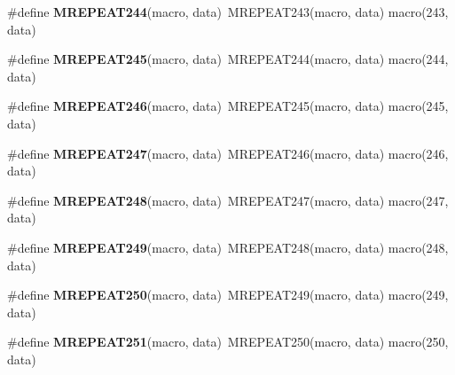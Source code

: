 \begin{DoxyCompactItemize}
\item 
\hypertarget{group__group__sam0__utils__mrepeat_ga96b96568f137828bd94f1df72f9ea533}{}\#define {\bfseries M\+R\+E\+P\+E\+A\+T244}(macro,  data)~M\+R\+E\+P\+E\+A\+T243(macro, data)   macro(243, data)\label{group__group__sam0__utils__mrepeat_ga96b96568f137828bd94f1df72f9ea533}

\item 
\hypertarget{group__group__sam0__utils__mrepeat_gaef88abd24a21c1424bcef16151f33acc}{}\#define {\bfseries M\+R\+E\+P\+E\+A\+T245}(macro,  data)~M\+R\+E\+P\+E\+A\+T244(macro, data)   macro(244, data)\label{group__group__sam0__utils__mrepeat_gaef88abd24a21c1424bcef16151f33acc}

\item 
\hypertarget{group__group__sam0__utils__mrepeat_ga648b2d33e6ae37d7f576055603bcb620}{}\#define {\bfseries M\+R\+E\+P\+E\+A\+T246}(macro,  data)~M\+R\+E\+P\+E\+A\+T245(macro, data)   macro(245, data)\label{group__group__sam0__utils__mrepeat_ga648b2d33e6ae37d7f576055603bcb620}

\item 
\hypertarget{group__group__sam0__utils__mrepeat_ga93c99f19dd27b6ad1c3921e4f473f50d}{}\#define {\bfseries M\+R\+E\+P\+E\+A\+T247}(macro,  data)~M\+R\+E\+P\+E\+A\+T246(macro, data)   macro(246, data)\label{group__group__sam0__utils__mrepeat_ga93c99f19dd27b6ad1c3921e4f473f50d}

\item 
\hypertarget{group__group__sam0__utils__mrepeat_ga0bee84ef9cc1bc4f81563c8fc476fed4}{}\#define {\bfseries M\+R\+E\+P\+E\+A\+T248}(macro,  data)~M\+R\+E\+P\+E\+A\+T247(macro, data)   macro(247, data)\label{group__group__sam0__utils__mrepeat_ga0bee84ef9cc1bc4f81563c8fc476fed4}

\item 
\hypertarget{group__group__sam0__utils__mrepeat_ga09e41b2792e87e2db97093c344127c3d}{}\#define {\bfseries M\+R\+E\+P\+E\+A\+T249}(macro,  data)~M\+R\+E\+P\+E\+A\+T248(macro, data)   macro(248, data)\label{group__group__sam0__utils__mrepeat_ga09e41b2792e87e2db97093c344127c3d}

\item 
\hypertarget{group__group__sam0__utils__mrepeat_ga35656197f887f34430287ec13dc48193}{}\#define {\bfseries M\+R\+E\+P\+E\+A\+T250}(macro,  data)~M\+R\+E\+P\+E\+A\+T249(macro, data)   macro(249, data)\label{group__group__sam0__utils__mrepeat_ga35656197f887f34430287ec13dc48193}

\item 
\hypertarget{group__group__sam0__utils__mrepeat_ga1b24f68c1e46baf224a8d05207d768f4}{}\#define {\bfseries M\+R\+E\+P\+E\+A\+T251}(macro,  data)~M\+R\+E\+P\+E\+A\+T250(macro, data)   macro(250, data)\label{group__group__sam0__utils__mrepeat_ga1b24f68c1e46baf224a8d05207d768f4}


\end{DoxyCompactItemize}
